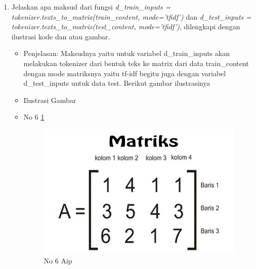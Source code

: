\begin{enumerate}
\item Jelaskan apa maksud dari fungsi \emph{d\_train\_inputs = tokenizer.texts\_to\_matrix(train\_content, mode='tfidf')} dan \emph{d\_test\_inputs = tokenizer.texts\_to\_matrix(test\_content, mode='tfidf')}, dilengkapi dengan ilustrasi kode dan atau gambar.
\begin{itemize}
\item Penjelasan: Maksudnya yaitu untuk variabel d\_train\_inputs akan melakukan tokenizer dari bentuk teks ke matrix dari data train\_content dengan mode matriksnya yaitu tf-idf begitu juga dengan variabel d\_test\_inputs untuk data test. Berikut gambar ilustrasinya
\par 
\par
\item Ilustrasi Gambar
\item No 6 \ref{teori6}
\begin{figure}[!hbtp]
\centering
\includegraphics[scale=0.3]{figures/AIP/g6.PNG}
\caption{No 6 Aip}
\label{teori6}
\end{figure}
\par
\end{itemize}
\par
\par


\end{enumerate}
